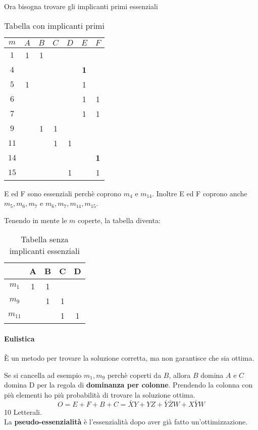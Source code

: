 \documentclass[a4paper]{article}
\theoremstyle{break}
\theoremstyle{break}
\theoremstyle{break}
\theoremstyle{break}
\begin{document}
\begin{example}
Ora bisogna trovare gli implicanti primi essenziali
\begin{table}[H]
    \begin{center}
        \begin{tabular}{c|c|c|c|c|c|c}
            \( m \) & \( A \) & \( B \) & \( C \) & \( D \) & \( E \) & \( F \)\\ 
            \hline
            \( 1 \) & 1 & 1 &  &  &  &   \\
            \( 4 \) &  &  &  &  & \textbf{1} &   \\
            \( 5 \) & 1 &  &  &  & 1 &   \\
            \( 6 \) &  &  &  &  & 1 & 1  \\
            \( 7 \) &  &  &  &  & 1 & 1  \\
            \( 9 \) &  & 1 & 1 &  &  &   \\
            \( 11 \) &  &  & 1 & 1 &  &  \\
            \( 14 \) &  &  &  &  &  & \textbf{1}  \\
            \( 15 \) &  &  &  & 1 &  & 1  \\
        \end{tabular}
    \end{center}
    \caption{Tabella con implicanti primi}
\end{table}
E ed F sono essenziali perchè coprono \( m_4 \) e \( m_{14} \). Inoltre E ed F coprono
anche \( m_5, m_6, m_7 \) e \( m_6, m_7, m_{14}, m_{15} \).  

Tenendo in mente le \( m \) coperte, la tabella diventa:
\begin{table}[H]
    \begin{center}
        \begin{tabular}{c|c|c|c|c}
        & A & B & C & D\\
        \hline
            \( m_1 \) & 1 & 1 &  &  \\ 
            \( m_9 \) &  & 1 & 1 &  \\
            \( m_{11} \) &  &  & 1 & 1 \\ 
        \end{tabular}
    \end{center}
    \caption{Tabella senza implicanti essenziali}
\end{table}
\paragraph{Eulistica} È un metodo per trovare la soluzione corretta, ma non garantisce
che sia ottima.

Se si cancella ad esempio \( m_1, m_9 \) perchè coperti da \( B \), allora \( B \)
domina \( A \) e \( C \) domina D per la regola di \textbf{dominanza per colonne}.
Prendendo la colonna con più elementi ho più probabilità di trovare la soluzione
ottima.
\[
    O=E+F+B+C = \bar{X}Y+YZ+\bar{Y}\bar{Z}W+X\bar{Y}W
\] 
10 Letterali.\\
La \textbf{pseudo-essenzialità} è l'essenzialità dopo aver già fatto un'ottimizzazione.
\end{example}
\end{document}
